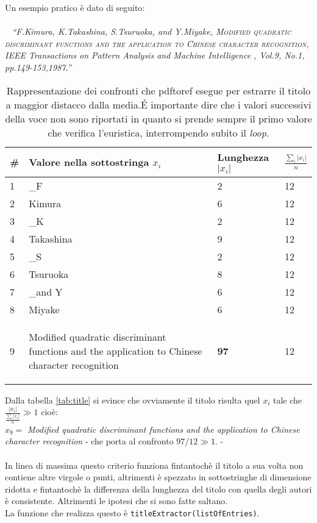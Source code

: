 Un esempio pratico è dato di seguito:\\
\\~
\textit{``F.Kimura, K.Takashina, S.Tsuruoka, and Y.Miyake, \textsc{Modified quadratic discriminant functions and the application to Chinese character recognition}, IEEE Transactions on Pattern Analysis and Machine Intelligence , Vol.9, No.1, pp.149-153,1987.'' }
\\
\begin{table}\label{tab:title}
\begin{center}
\begin{tabular}[b]{|l|l|l|l|} \hline
	\#  & Valore nella sottostringa $x_i$ & Lunghezza $|x_i|$ & $  \frac{\sum_i |x_i|}{n}$  \\ \hline
	1 & \_F & 2 & 12 \\  
	2 & Kimura & 6 & 12 \\ 
	3 & \_K & 2 & 12 \\ 
	4 & Takashina & 9 & 12 \\
	5 & \_S & 2 & 12 \\
	6 & Tsuruoka & 8 & 12 \\
	7 & \_and Y & 6 & 12 \\
	8 & Miyake & 6 & 12 \\ 
	9 & \begin{scriptsize}Modified quadratic discriminant functions and the  application to Chinese character recognition\end{scriptsize} & \textbf{97} & 12 \\ \hline
\end{tabular}

\tiny{\caption{Rappresentazione dei confronti che pdftoref esegue per estrarre il titolo a maggior distacco dalla media.\'E importante dire che i valori successivi della voce non sono riportati in quanto si prende sempre il primo valore che verifica l'euristica, interrompendo subito il \textit{loop}.}}

\label{label}
\end{center}
\end{table}

Dalla tabella \ref{tab:title} si evince che ovviamente il titolo risulta quel $x_i$ tale che $ \frac{|x_i|}{ \frac{\sum_i |x_i|}{n}} \gg 1 $ cioè:
\\ $ x_9= $ \textit{Modified quadratic discriminant functions and the application to Chinese character recognition} - che porta al confronto $97/12 \gg 1$. -
\\~\\
In linea di massima questo criterio funziona fintantochè il titolo a sua volta non contiene altre virgole o punti, altrimenti è spezzato in sottostringhe di dimensione ridotta e fintantochè la differenza della lunghezza del titolo con quella degli autori è consistente. Altrimenti le ipotesi che si sono fatte saltano. \\ La funzione che realizza questo è \texttt{titleExtractor(listOfEntries)}.


